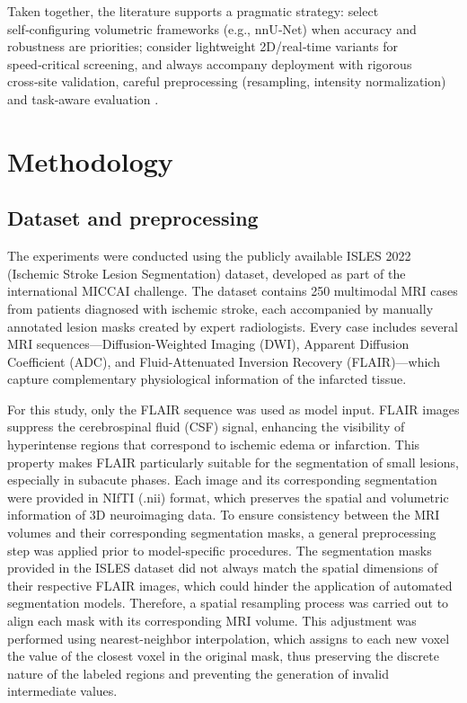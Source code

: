 \documentclass[12pt]{article}
\begin{document}
Taken together, the literature supports a pragmatic strategy: select self‑configuring volumetric frameworks (e.g., nnU‑Net) when accuracy and robustness are priorities; consider lightweight 2D/real‑time variants for speed‑critical screening, and always accompany deployment with rigorous cross‑site validation, careful preprocessing (resampling, intensity normalization) and task‑aware evaluation \cite{Isensee2021,liFullyConvolutionalNetwork2018,Menze2015}.


\section{Methodology} \label{sec:methodology}

\subsection{Dataset and preprocessing} \label{subsec:dataset}

The experiments were conducted using the publicly available ISLES 2022 (Ischemic Stroke Lesion Segmentation) dataset, developed as part of the international MICCAI challenge. The dataset contains 250 multimodal MRI cases from patients diagnosed with ischemic stroke, each accompanied by manually annotated lesion masks created by expert radiologists. Every case includes several MRI sequences—Diffusion-Weighted Imaging (DWI), Apparent Diffusion Coefficient (ADC), and Fluid-Attenuated Inversion Recovery (FLAIR)—which capture complementary physiological information of the infarcted tissue.

For this study, only the FLAIR sequence was used as model input. FLAIR images suppress the cerebrospinal fluid (CSF) signal, enhancing the visibility of hyperintense regions that correspond to ischemic edema or infarction. This property makes FLAIR particularly suitable for the segmentation of small lesions, especially in subacute phases. Each image and its corresponding segmentation were provided in NIfTI (.nii) format, which preserves the spatial and volumetric information of 3D neuroimaging data. To ensure consistency between the MRI volumes and their corresponding segmentation masks, a general preprocessing step was applied prior to model-specific procedures. The segmentation masks provided in the ISLES dataset did not always match the spatial dimensions of their respective FLAIR images, which could hinder the application of automated segmentation models. Therefore, a spatial resampling process was carried out to align each mask with its corresponding MRI volume. This adjustment was performed using nearest-neighbor interpolation, which assigns to each new voxel the value of the closest voxel in the original mask, thus preserving the discrete nature of the labeled regions and preventing the generation of invalid intermediate values.
\end{document}
